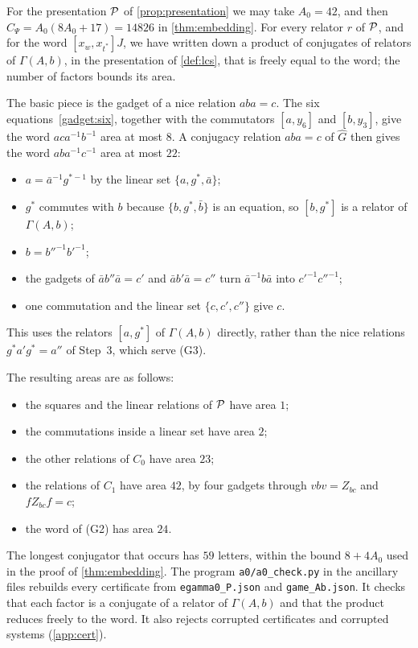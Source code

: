 \begin{remark}\label{rem:A0}
For the presentation $\mathcal P$ of \cref{prop:presentation} we may take $A_0=42$, and then $C_\Psi=A_0(8A_0+17)=14826$ in
\cref{thm:embedding}. For every relator $r$ of $\mathcal P$, and for the word $[x_w,x_{t^*}]J$, we have written down a product of conjugates of
relators of $\Gamma(A,b)$, in the presentation of \cref{def:lcs}, that is freely equal to the word; the number of factors bounds its area.

The basic piece is the gadget of a nice relation $aba=c$. The six equations~\eqref{gadget:six}, together with the commutators $[a,y_6]$ and
$[b,y_3]$, give the word $aca^{-1}b^{-1}$ area at most $8$. A conjugacy relation $aba=c$ of $\widehat G$ then gives the word
$aba^{-1}c^{-1}$ area at most $22$:
\begin{itemize}[itemsep=1pt]
\item $a=\bar a^{-1}g^{*-1}$ by the linear set $\{a,g^*,\bar a\}$;
\item $g^*$ commutes with $b$ because $\{b,g^*,\bar b\}$ is an equation, so $[b,g^*]$ is a relator of $\Gamma(A,b)$;
\item $b=b''^{-1}b'^{-1}$;
\item the gadgets of $\bar ab''\bar a=c'$ and $\bar ab'\bar a=c''$ turn $\bar a^{-1}b\bar a$ into $c'^{-1}c''^{-1}$;
\item one commutation and the linear set $\{c,c',c''\}$ give $c$.
\end{itemize}
This uses the relators $[a,g^*]$ of $\Gamma(A,b)$ directly, rather than the nice relations $g^*a'g^*=a''$ of Step~3, which serve (G3).

The resulting areas are as follows:
\begin{itemize}[itemsep=1pt]
\item the squares and the linear relations of $\mathcal P$ have area $1$;
\item the commutations inside a linear set have area $2$;
\item the other relations of $C_0$ have area $23$;
\item the relations of $C_1$ have area $42$, by four gadgets through $vbv=Z_{bc}$ and $fZ_{bc}f=c$;
\item the word of (G2) has area $24$.
\end{itemize}
The longest conjugator that occurs has $59$ letters, within the bound $8+4A_0$ used in the proof of \cref{thm:embedding}. The program
\texttt{a0/a0\_check.py} in the ancillary files rebuilds every certificate from \texttt{egamma0\_P.json} and \texttt{game\_Ab.json}. It
checks that each factor is a conjugate of a relator of $\Gamma(A,b)$ and that the product reduces freely to the word. It also rejects
corrupted certificates and corrupted systems (\cref{app:cert}).
\end{remark}

